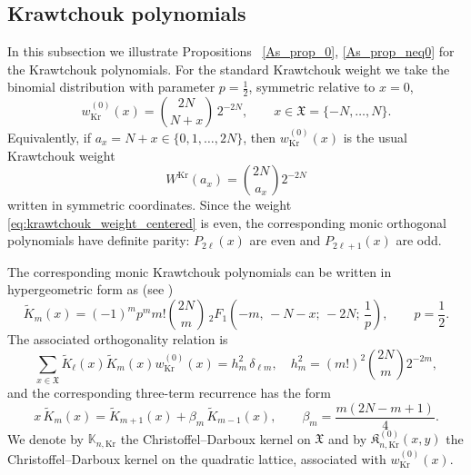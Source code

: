 \documentclass[reqno,11pt]{amsart}
\theoremstyle{plain}
\theoremstyle{definition}
\numberwithin{equation}{section}
\begin{document}
\subsection{Krawtchouk polynomials}
In this subsection we illustrate  Propositions ~\ref{As_prop_0}, \ref{As_prop_neq0} for the Krawtchouk polynomials. For the standard Krawtchouk weight we take the binomial distribution with parameter \(p=\tfrac12\), symmetric relative to $x=0$,
\begin{equation}\label{eq:krawtchouk_weight_centered}
w_{\mathrm{Kr}}^{(0)}(x)
=
\binom{2N}{N+x}\,2^{-2N},
\qquad x\in\mathfrak X=\{-N, \dots,N\}.
\end{equation}
Equivalently, if \(a_x=N+x\in\{0,1,\dots,2N\}\), then \(w_{\mathrm{Kr}}^{(0)}(x)\) is the usual Krawtchouk weight
\[
W^{\mathrm{Kr}}(a_x)=\binom{2N}{a_x}2^{-2N}
\]
written in symmetric coordinates. Since the weight \eqref{eq:krawtchouk_weight_centered} is even, the corresponding monic orthogonal polynomials have definite parity: \(P_{2\ell}(x)\) are even and \(P_{2\ell+1}(x)\) are odd.


The corresponding monic Krawtchouk polynomials can be written in hypergeometric form as (see \cite{Koekoek})
\begin{equation}\label{eq:krawtchouk_hypergeometric}
\widetilde K_m(x)
=
(-1)^mp^mm!\binom{2N}{m}\,
{}_2F_1\!\left(
-m,\,-N-x;\,-2N;\,\frac{1}{p}
\right),
\qquad p=\frac12.
\end{equation}
The associated orthogonality relation is
\begin{equation}\label{eq:krawtchouk_orthogonality}
\sum_{x\in\mathfrak X}
\widetilde K_\ell\!\left(x\right)
\widetilde K_m\!\left(x\right)
w_{\mathrm{Kr}}^{(0)}(x)
=
h_m^2\,\delta_{\ell m}, \quad h_m^2=(m!)^2\binom{2N}{m}2^{-2m},
\end{equation}
and the corresponding three-term recurrence has the form
\begin{equation}\label{eq:krawtchouk_recurrence}
x\,\widetilde K_m(x)
=
\widetilde K_{m+1}(x)+\beta_m\,\widetilde K_{m-1}(x),
\qquad
\beta_m=\frac{m(2N-m+1)}{4}.
\end{equation}
We denote by $\mathbb{K}_{n,\mathrm{Kr}}$ the Christoffel--Darboux kernel on $\mathfrak{X}$ and by \(\mathfrak K^{(0)}_{n,\mathrm{Kr}}(x,y)\) the Christoffel--Darboux kernel on the quadratic lattice, associated with \(w_{\mathrm{Kr}}^{(0)}(x)\).
\end{document}
